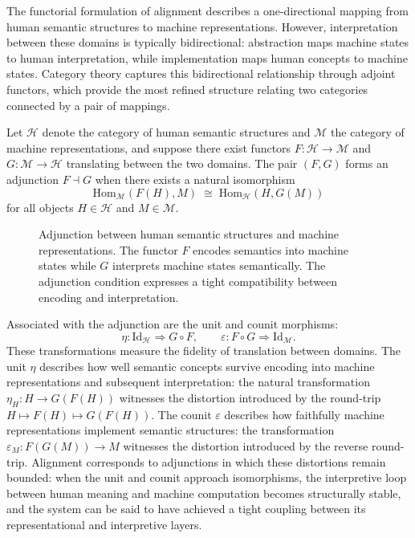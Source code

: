 \documentclass[12pt]{article}
\theoremstyle{definition}
\begin{document}
The functorial formulation of alignment describes a one-directional mapping from
human semantic structures to machine representations. However, interpretation
between these domains is typically bidirectional: abstraction maps machine states
to human interpretation, while implementation maps human concepts to machine
states. Category theory captures this bidirectional relationship through adjoint
functors, which provide the most refined structure relating two categories
connected by a pair of mappings.

Let $\mathcal{H}$ denote the category of human semantic structures and
$\mathcal{M}$ the category of machine representations, and suppose there exist
functors $F : \mathcal{H} \to \mathcal{M}$ and $G : \mathcal{M} \to
\mathcal{H}$ translating between the two domains. The pair $(F, G)$ forms an
adjunction $F \dashv G$ when there exists a natural isomorphism
\begin{equation}
  \mathrm{Hom}_{\mathcal{M}}(F(H), M)
  \;\cong\;
  \mathrm{Hom}_{\mathcal{H}}(H, G(M))
\end{equation}
for all objects $H \in \mathcal{H}$ and $M \in \mathcal{M}$.

\begin{figure}[h]
\centering
{}
\caption{Adjunction between human semantic structures and machine representations.
The functor $F$ encodes semantics into machine states while $G$ interprets
machine states semantically. The adjunction condition expresses a tight
compatibility between encoding and interpretation.}
\end{figure}

Associated with the adjunction are the unit and counit morphisms:
\begin{equation}
  \eta : \mathrm{Id}_{\mathcal{H}} \Rightarrow G \circ F,
  \qquad
  \varepsilon : F \circ G \Rightarrow \mathrm{Id}_{\mathcal{M}}.
\end{equation}
These transformations measure the fidelity of translation between domains. The
unit $\eta$ describes how well semantic concepts survive encoding into machine
representations and subsequent interpretation: the natural transformation
$\eta_H : H \to G(F(H))$ witnesses the distortion introduced by the round-trip
$H \mapsto F(H) \mapsto G(F(H))$. The counit $\varepsilon$ describes how
faithfully machine representations implement semantic structures: the
transformation $\varepsilon_M : F(G(M)) \to M$ witnesses the distortion
introduced by the reverse round-trip. Alignment corresponds to adjunctions in
which these distortions remain bounded: when the unit and counit approach
isomorphisms, the interpretive loop between human meaning and machine
computation becomes structurally stable, and the system can be said to have
achieved a tight coupling between its representational and interpretive layers.
\end{document}
